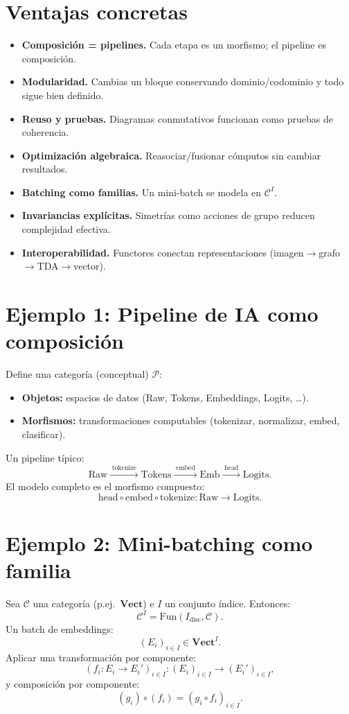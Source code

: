 \documentclass[12pt,oneside]{book}
\theoremstyle{definition}
\begin{document}
\section{Ventajas concretas}
\begin{itemize}[leftmargin=1.5em]
  \item \textbf{Composición = pipelines.} Cada etapa es un morfismo; el pipeline es composición.
  \item \textbf{Modularidad.} Cambias un bloque conservando dominio/codominio y todo sigue bien definido.
  \item \textbf{Reuso y pruebas.} Diagramas conmutativos funcionan como pruebas de coherencia.
  \item \textbf{Optimización algebraica.} Reasociar/fusionar cómputos sin cambiar resultados.
  \item \textbf{Batching como familias.} Un mini-batch se modela en $\mathcal{C}^I$.
  \item \textbf{Invariancias explícitas.} Simetrías como acciones de grupo reducen complejidad efectiva.
  \item \textbf{Interoperabilidad.} Functores conectan representaciones (imagen$\to$grafo$\to$TDA$\to$vector).
\end{itemize}

\section{Ejemplo 1: Pipeline de IA como composición}
Define una categoría (conceptual) $\mathcal{P}$:
\begin{itemize}[leftmargin=1.5em]
  \item \textbf{Objetos:} espacios de datos (Raw, Tokens, Embeddings, Logits, \dots).
  \item \textbf{Morfismos:} transformaciones computables (tokenizar, normalizar, embed, clasificar).
\end{itemize}

Un pipeline típico:
\[
\mathrm{Raw}
\xrightarrow{\;\mathrm{tokenize}\;}
\mathrm{Tokens}
\xrightarrow{\;\mathrm{embed}\;}
\mathrm{Emb}
\xrightarrow{\;\mathrm{head}\;}
\mathrm{Logits}.
\]
El modelo completo es el morfismo compuesto:
\[
\mathrm{head}\circ \mathrm{embed}\circ \mathrm{tokenize}:\mathrm{Raw}\to \mathrm{Logits}.
\]

\section{Ejemplo 2: Mini-batching como familia}
Sea $\mathcal{C}$ una categoría (p.ej.\ $\mathbf{Vect}$) e $I$ un conjunto índice.
Entonces:
\[
\mathcal{C}^I=\mathrm{Fun}(I_{\mathrm{disc}},\mathcal{C}).
\]
Un batch de embeddings:
\[
(E_i)_{i\in I}\in \mathbf{Vect}^I.
\]
Aplicar una transformación por componente:
\[
(f_i:E_i\to E_i')_{i\in I}:(E_i)_{i\in I}\to (E_i')_{i\in I},
\]
y composición por componente:
\[
(g_i)\circ(f_i)=(g_i\circ f_i)_{i\in I}.
\]
\end{document}
